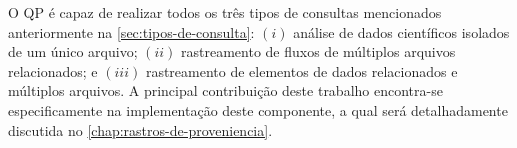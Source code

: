 O QP é capaz de realizar todos os três tipos de consultas mencionados anteriormente na \autoref{sec:tipos-de-consulta}: \((i)\) análise de dados científicos isolados de um único arquivo; \((ii)\) rastreamento de fluxos de múltiplos arquivos relacionados; e \((iii)\) rastreamento de elementos de dados relacionados e múltiplos arquivos. 
A principal contribuição deste trabalho encontra-se especificamente na implementação deste componente, a qual será detalhadamente discutida no \autoref{chap:rastros-de-proveniencia}.